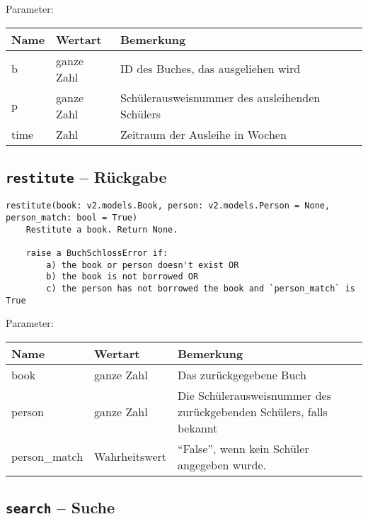 Parameter:

\begin{tabular}{|p{}|p{}|p{}|}
Name & Wertart & Bemerkung\\
\hline
b & ganze Zahl & ID des Buches, das ausgeliehen wird \\
p & ganze Zahl & Schülerausweisnummer des ausleihenden Schülers \\
time & Zahl & Zeitraum der Ausleihe in Wochen
\end{tabular}

\subsection{\texttt{restitute} -- Rückgabe}
\label{subsec:command_list:restitute}

\begin{verbatim}
restitute(book: v2.models.Book, person: v2.models.Person = None,
person_match: bool = True)
    Restitute a book. Return None.

    raise a BuchSchlossError if:
        a) the book or person doesn't exist OR
        b) the book is not borrowed OR
        c) the person has not borrowed the book and `person_match` is True
\end{verbatim}

Parameter:

\begin{tabular}{|p{}|p{}|p{}|}
Name & Wertart & Bemerkung\\
\hline
book & ganze Zahl & Das zurückgegebene Buch \\
person & ganze Zahl & Die Schülerausweisnummer des zurückgebenden Schülers, falls bekannt \\
person\_match & Wahrheitswert & ``False'', wenn kein Schüler angegeben wurde.
\end{tabular}

\subsection{\texttt{search} -- Suche}
\label{subsec:command_list:search}

